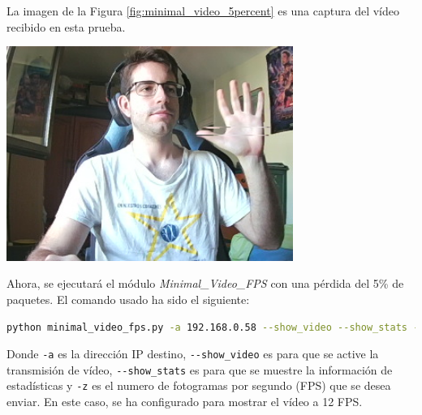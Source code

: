 \newpage

La imagen de la Figura \ref{fig:minimal_video_5percent} es una captura del vídeo recibido en esta prueba.
\begin{center}
  \includegraphics[width = 0.7\textwidth]{images/VideoRecibido7.1.png}
  \label{fig:minimal_video_5percent}
\end{center}
\newpage


Ahora, se ejecutará el módulo \textit{Minimal\_Video\_FPS} con una pérdida del 5\% de paquetes. El comando usado ha sido el siguiente:

\begin{lstlisting}[language=bash, basicstyle=\ttfamily\scriptsize]
    python minimal_video_fps.py -a 192.168.0.58 --show_video --show_stats -z 12
\end{lstlisting}
Donde \verb|-a| es la dirección IP destino, \verb|--show_video| es para que se active la transmisión de vídeo, \verb|--show_stats| es para que se muestre la información de estadísticas y \verb|-z| es el numero de fotogramas por segundo (FPS) que se desea enviar. En este caso, se ha configurado para mostrar el vídeo a 12 FPS.
\vspace{\baselineskip}

